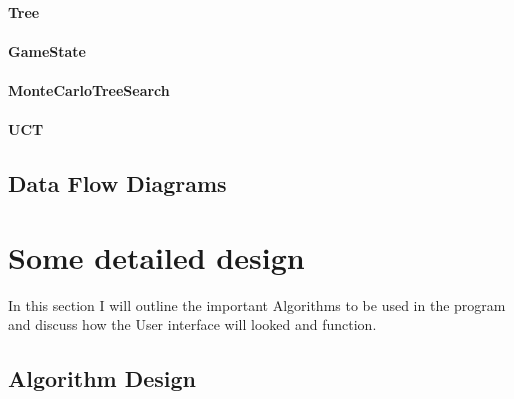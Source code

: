 \paragraph{Tree}
\paragraph{GameState}
\paragraph{MonteCarloTreeSearch}
\paragraph{UCT}

\subsection{Data Flow Diagrams}
\section{Some detailed design}
In this section I will outline the important Algorithms to be used in the program and discuss how the User interface will looked and function.
\subsection{Algorithm Design}
